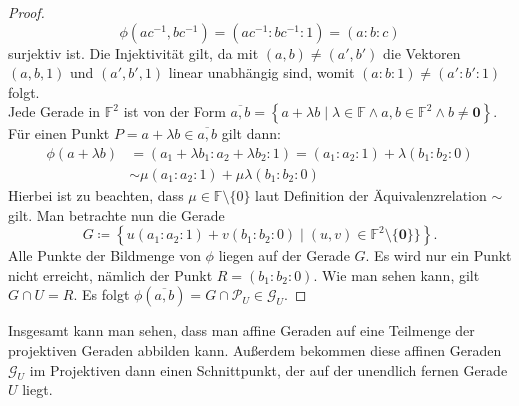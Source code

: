 \documentclass[hidelinks]{article}
\theoremstyle{plain}
\theoremstyle{definition}
\theoremstyle{rem}
\newcommand{\fnz}{\mathbb{F}\setminus\{0\}}
\newcommand{\ftwnz}{\mathbb{F}^{2}\setminus\{\boldsymbol 0\}}
\newcommand{\pu}{\mathcal{P}_U}
\newcommand{\gu}{\mathcal{G}_U}
\begin{document}
\begin{sloppypar}
\begin{proof}
    \begin{equation*}
        \phi(ac^{-1},bc^{-1}) = (ac^{-1}:bc^{-1}:1) = (a:b:c)
    \end{equation*}
    surjektiv ist. Die Injektivität gilt, da mit $(a,b) \neq (a',b')$ die Vektoren $(a,b,1)$ und $(a',b',1)$ linear unabhängig sind, womit $(a:b:1) \neq (a':b':1)$ folgt. \\
    \newline
    Jede Gerade in $\mathbb{F}^2$ ist von der Form $\overline{a,b} = \left\{ a + \lambda b \mid \lambda \in \mathbb{F}\land a,b \in \mathbb{F}^2 \land b \neq \boldsymbol 0 \right\}$. Für einen Punkt $P = a + \lambda b \in \overline{a,b}$ gilt dann:
    \begin{equation*}
        \begin{aligned}
            \phi(a + \lambda b) & = (a_1 + \lambda b_1 : a_2 + \lambda b_2 : 1) = (a_1 : a_2 : 1) + \lambda (b_1 : b_2 : 0) \\
            & \sim \mu (a_1 : a_2 : 1) + \mu \lambda (b_1 : b_2 : 0)
        \end{aligned}
    \end{equation*}
    Hierbei ist zu beachten, dass $\mu \in \fnz$ laut Definition der Äquivalenzrelation $\sim$ gilt. Man betrachte nun die Gerade
    \begin{equation*}
        G \coloneqq \left\{ u(a_1 : a_2 : 1) + v(b_1 : b_2 : 0) \mid (u,v) \in \ftwnz\} \right\}.
    \end{equation*}
    Alle Punkte der Bildmenge von $\phi$ liegen auf der Gerade $G$. Es wird nur ein Punkt nicht erreicht, nämlich der Punkt $R = (b_1 : b_2 : 0)$. Wie man sehen kann, gilt $G \cap U = R$. Es folgt $\phi(\overline{a,b}) = G \cap \pu \in \gu$.
\end{proof}
Insgesamt kann man sehen, dass man affine Geraden auf eine Teilmenge der projektiven Geraden abbilden kann. Außerdem bekommen diese affinen Geraden $\gu$ im Projektiven dann einen Schnittpunkt, der auf der unendlich fernen Gerade $U$ liegt.

\end{sloppypar}
\end{document}
